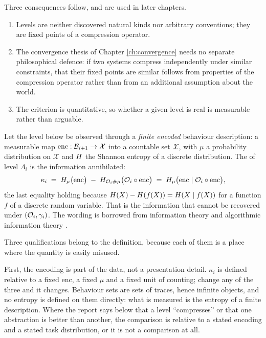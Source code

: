 \begin{remark}
Three consequences follow, and are used in later chapters.
\begin{enumerate}[label=(\alph*)]
\item Levels are neither discovered natural kinds nor arbitrary conventions; they are fixed
      points of a compression operator.
\item The convergence thesis of Chapter \ref{ch:convergence} needs no separate
      philosophical defence: if two systems compress independently under similar
      constraints, that their fixed points are similar follows from properties of the
      compression operator rather than from an additional assumption about the world.
\item The criterion is quantitative, so whether a given level is real is measurable rather
      than arguable.
\end{enumerate}
\end{remark}

\begin{definition}\label{def:compression}
Let the level below be observed through a \emph{finite encoded} behaviour description: a measurable
map $\mathrm{enc} : \mathcal{B}_{i+1} \to \mathcal{X}$ into a countable set $\mathcal{X}$, with $\mu$ a
probability distribution on $\mathcal{X}$ and $H$ the Shannon entropy of a discrete
distribution. The  of level $\Lambda_i$ is the information annihilated:
\begin{equation}\label{eq:compression}
\kappa_i \;=\; H_{\mu}\bigl(\mathrm{enc}\bigr) \;-\;
H_{\mathcal{O}_i \# \mu}\bigl(\mathcal{O}_i \circ \mathrm{enc}\bigr)
\;=\; H_{\mu}\bigl(\mathrm{enc} \mid \mathcal{O}_i \circ \mathrm{enc}\bigr),
\end{equation}
the last equality holding because $H(X) - H(f(X)) = H(X \mid f(X))$ for a
function $f$ of a discrete random variable. That is the information that cannot be recovered under
$(\mathcal{O}_i, \gamma_i)$. The wording is borrowed from information theory \cite{shannon1948} and
algorithmic information theory \cite{kolmogorov1965}.
\end{definition}

Three qualifications belong to the definition, because each of them is a place where the quantity is
easily misused.

First, the encoding is part of the data, not a presentation detail. $\kappa_i$ is defined relative
to a fixed $\mathrm{enc}$, a fixed $\mu$ and a fixed unit of counting; change any of the three and it
changes. Behaviour sets are sets of traces, hence infinite objects, and no entropy is defined on them
directly: what is measured is the entropy of a finite description. Where the report says below that a
level ``compresses'' or that one abstraction is better than another, the comparison is relative to a
stated encoding and a stated task distribution, or it is not a comparison at all.

